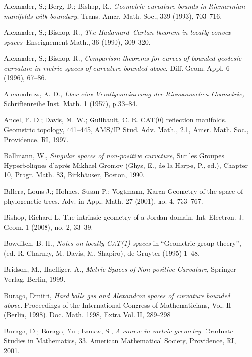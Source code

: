 \begin{thebibliography}{52}

 Alexander, S.; Berg, D.; Bishop, R., \textit{Geometric curvature bounds in Riemannian manifolds with
boundary}. Trans. Amer. Math. Soc., 339 (1993), 703--716.

Alexander, S.; Bishop, R., \textit{The Hadamard--Cartan theorem in locally convex spaces}. Enseignement Math., 36 (1990), 309--320.

 Alexander, S.; Bishop, R., 
\textit{Comparison theorems for curves of bounded geodesic curvature in metric spaces of curvature bounded above}.
Diff. Geom. Appl. 6 (1996), 67--86.

 Alexandrow, A. D.,  \textit{\"Uber eine Verallgemeinerung der Riemannschen Geometrie,}
Schriftenreihe Inst. Math. 1 (1957), p.33--84.

 Ancel, F. D.; Davis, M. W.; Guilbault, C. R.
CAT(0) reflection manifolds. Geometric topology, 441--445,
AMS/IP Stud. Adv. Math., 2.1, Amer. Math. Soc., Providence, RI, 1997.

Ballmann, W., \textit{Singular spaces of non-positive curvature}, Sur les Groupes Hyperboliques d'apr\'{e}s Mikhael Gromov (Ghys, E., de la Harpe, P., ed.), Chapter 10, Progr. Math. 83, Birkh\"auser, Boston, 1990. 

 Billera, Louis J.; Holmes, Susan P.; Vogtmann, Karen Geometry of the space of phylogenetic trees. Adv. in Appl. Math. 27 (2001), no. 4, 733--767.

Bishop, Richard L. The intrinsic geometry of a Jordan domain. Int. Electron. J. Geom. 1 (2008), no. 2, 33--39.

 Bowditch, B. H.,
\textit{Notes on locally CAT(1) spaces} 
in ``Geometric group theory'', (ed. R. Charney, M. Davis, M. Shapiro), de Gruyter (1995) 1--48.

Bridson, M., Haefliger, A.,
\textit{Metric Spaces of Non-positive Curvature},
Springer-Verlag, Berlin, 1999.

 Burago, Dmitri, \textit{Hard balls gas and Alexandrov spaces of curvature bounded above.} Proceedings of the International Congress of Mathematicians, Vol. II (Berlin, 1998). Doc. Math. 1998, Extra Vol. II, 289–298

 Burago, D.; Burago, Yu.; Ivanov, S., \textit{A course in metric geometry.} Graduate Studies in Mathematics, 33. American Mathematical Society, Providence, RI, 2001. 


\end{thebibliography}
